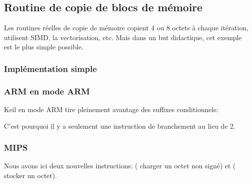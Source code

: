 ﻿\subsection{Routine de copie de blocs de mémoire}
\label{loop_memcpy}

Les routines réelles de copie de mémoire copient 4 ou 8 octets à chaque itération,
utilisent \ac{SIMD}, la vectorisation, etc.
Mais dans un but didactique, cet exemple est le plus simple possible.



\subsubsection{Implémentation simple}







\subsubsection{ARM en mode ARM}

Keil en mode ARM tire pleinement avantage des suffixes conditionnels:



C'est pourquoi il y a seulement une instruction de branchement au lieu de 2.

\subsubsection{MIPS}




Nous avons ici deux nouvelles instructions:  ( charger
un octet non signé) et  ( stocker un octet).

